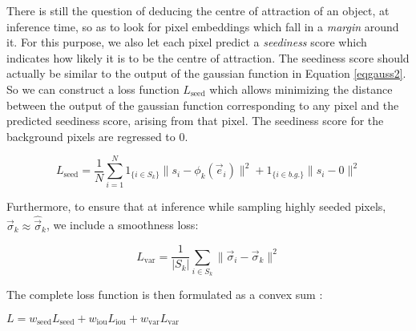 \documentclass{midl} %
\begin{document}
There is still the question of deducing the centre of attraction of an object, at inference time, so as to look for pixel embeddings which fall in a \emph{margin} around it. For this purpose, we also let each pixel predict a \emph{seediness} score which indicates how likely it is to be the centre of attraction. The seediness score should actually be similar to the output of the gaussian function in Equation \eqref{eqgauss2}. So we can construct a loss function $L_{\text{seed}}$ which allows minimizing the distance between the output of the gaussian function corresponding to any pixel and the predicted seediness score, arising from that pixel. The seediness score for the background pixels are regressed to 0.

\begin{equation}
    L_{\text{seed}}=\frac{1}{N} \sum_{i=1}^{N} 1_{\{i \in S_{k}\}} \lVert s_{i} - \phi_{k} (\vec{e}_{i}) \rVert^{2} +  1_{\{i \in b.g.\}} \lVert s_{i} - 0 \rVert^{2}
    \label{eqseed}
\end{equation}

Furthermore, to ensure that at inference while sampling highly seeded pixels, $\vec{\sigma}_{k} \approx \hat{\vec{\sigma}}_{k}$, we include a smoothness loss:


\begin{equation}
    L_{\text{var}}= \frac{1}{\vert S_{k} \vert}\sum_{i \in S_{k}} \lVert \vec{\sigma}_{i} - \vec{\sigma}_{k} \rVert^{2}
    \label{eqvar}
\end{equation}

The complete loss function is then formulated as a convex sum :

$L = w_{\text{seed}} L_{\text{seed}} + w_{\text{iou}} L_{\text{iou}} + w_{\text{var}} L_{\text{var}}$


\end{document}
